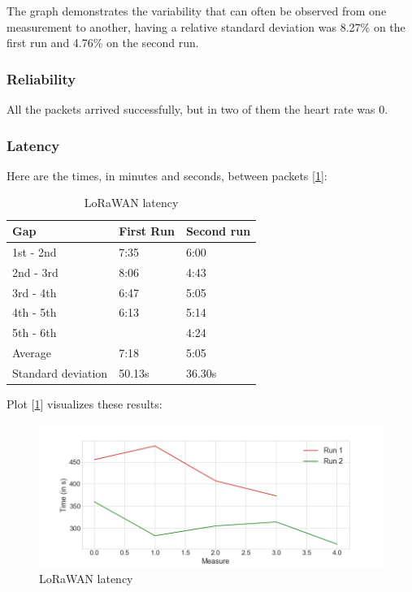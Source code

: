 			The graph demonstrates the variability that can often be observed from one measurement to another, having a relative standard deviation was 8.27\% on the first run and 4.76\% on the second run.

		\subsubsection{Reliability}
			All the packets arrived successfully, but in two of them the heart rate was $0$.

		\subsubsection{Latency}
			Here are the times, in minutes and seconds, between packets [\ref{fig:Latency}]:
			\begin{table}[h!]
				\centering
				\begin{tabular}{@{}lll@{}}
					\toprule
					\textbf{Gap}&\textbf{First Run}& \textbf{Second run} 	 \\ \midrule
					1st - 2nd 			&	7:35		& 	6:00     	 \\
					2nd - 3rd 			&	8:06    	& 	4:43         \\
					3rd - 4th 			&	6:47		& 	5:05         \\
					4th - 5th 			&	6:13    	& 	5:14         \\
					5th - 6th 			&	         	& 	4:24         \\ \bottomrule
					Average     		&   7:18        &   5:05		 \\
					Standard deviation  &   50.13s      &   36.30s		 \\ \bottomrule
				\end{tabular}
				\caption[LoRaWAN latency]{LoRaWAN latency}
				\label{tab:Latency}
			\end{table}
			
			Plot [\ref{fig:Latency}] visualizes these results:
			\begin{figure}[h!]
				\centering
				\includegraphics[width=1.1\linewidth]{gfx/latency_diff.jpg}
				\caption{LoRaWAN latency}
				\label{fig:Latency}
			\end{figure}

